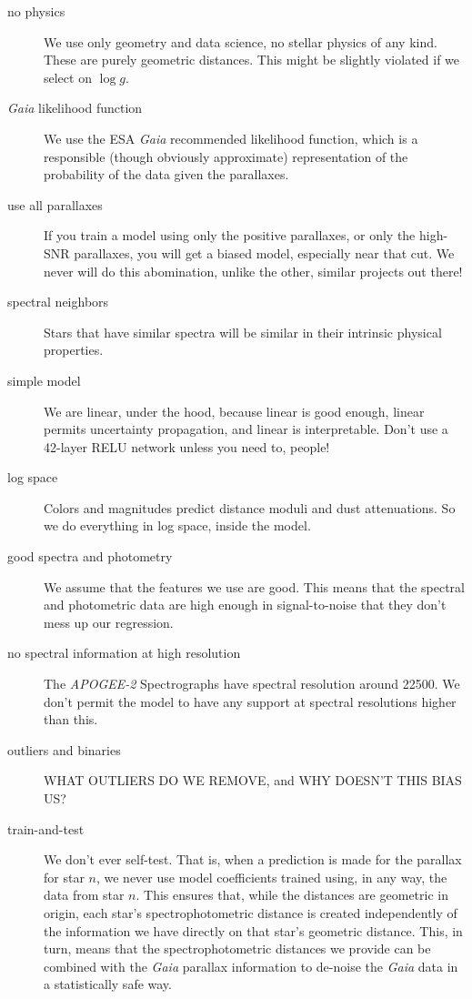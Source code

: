 \documentclass[modern]{aastex631}
\newcommand{\acronym}[1]{{\small{#1}}}
\newcommand{\project}[1]{\textsl{#1}}
\newcommand{\ESA}{\acronym{ESA}}
\newcommand{\Gaia}{\project{Gaia}}
\newcommand{\APOGEE}{\project{\acronym{APOGEE-2}}}
\begin{document}
\begin{description}
\item[no physics] We use only geometry and data science, no stellar physics
  of any kind. These are purely geometric distances. This might be slightly
  violated if we select on $\log g$.
\item[\Gaia{} likelihood function] We use the \ESA{} \Gaia{}
  recommended likelihood function, which is a responsible (though obviously
  approximate) representation of the probability of the data given the
  parallaxes.
\item[use all parallaxes] If you train a model using only the positive
  parallaxes, or only the high-SNR parallaxes, you will get a biased model,
  especially near that cut. We never will do this abomination, unlike the
  other, similar projects out there!
\item[spectral neighbors] Stars that have similar spectra will be similar in
  their intrinsic physical properties.
\item[simple model] We are linear, under the hood, because linear is good enough,
  linear permits uncertainty propagation, and linear is interpretable. Don't use
  a 42-layer RELU network unless you need to, people!
\item[log space] Colors and magnitudes predict distance moduli and
  dust attenuations. So we do everything in log space, inside the
  model.
\item[good spectra and photometry] We assume that the features we use are
  good. This means that the spectral and photometric data are high enough in
  signal-to-noise that they don't mess up our regression.
\item[no spectral information at high resolution] The \APOGEE{} Spectrographs
  have spectral resolution around 22500. We don't permit the model to have any
  support at spectral resolutions higher than this.
\item[outliers and binaries] WHAT OUTLIERS DO WE REMOVE, and WHY DOESN'T THIS BIAS US?
\item[train-and-test] We don't ever self-test. That is, when a prediction is
  made for the parallax for star $n$, we never use model coefficients trained
  using, in any way, the data from star $n$.
  This ensures that, while the distances are geometric in origin, each star's
  spectrophotometric distance is created
  independently of the information we have directly on that star's
  geometric distance. This, in turn, means that the spectrophotometric distances
  we provide can be combined with the \Gaia{} parallax information to de-noise
  the \Gaia{} data in a statistically safe way.
\end{description}
\end{document}
